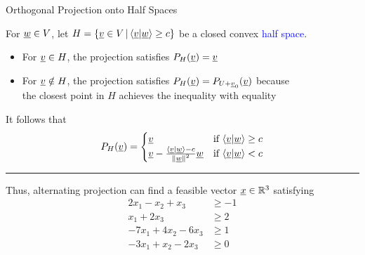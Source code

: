 \documentclass[10pt,letterpaper,english]{beamer}
\begin{document}
\begin{frame}{Orthogonal Projection onto Half Spaces}

\vspace{2mm}

For $\underline{w} \in V$, let $H = \{ \underline{v} \in V \,|\, \langle\underline v|\underline w\rangle\geq c \}$ be a closed convex \textcolor{blue}{half space}.

\begin{itemize}
\item For $\underline v\in H$, the projection satisfies $P_{H}(\underline v)=\underline v$ 
\item For $\underline v\notin H$, the projection satisfies $P_{H}(\underline v)=P_{U+\underline v_{0}}(\underline v)$ because \\ the closest point in $H$ achieves the inequality with equality
\end{itemize}

It follows that \vspace{-2.5mm}
\begin{equation*}
P_{H}(\underline v)=\begin{cases}
\underline v & \text{if }\langle\underline v|\underline w\rangle\geq c\\
\underline v-\frac{\left\langle \underline v|\underline w\right\rangle -c}{\left\Vert \underline w\right\Vert ^{2}}\underline w & \text{if }\langle\underline v|\underline w\rangle<c
\end{cases}\label{eq:proj_ineq}
\end{equation*}

\vspace{1mm}
\hrule
\vspace{4mm}
Thus, alternating projection can find a feasible vector $\underline{x}\in \mathbb{R}^3$ satisfying \vspace{-1mm}
{\small
\begin{align*}
2x_{1}-x_{2}+x_{3} & \geq-1\\
x_{1}+2x_{3} & \geq2\\
-7x_{1}+4x_{2}-6x_{3} & \geq1\\
-3x_{1}+x_{2}-2x_{3} & \geq0
\end{align*}
}
\vspace{-3mm}

\end{frame}
\end{document}
